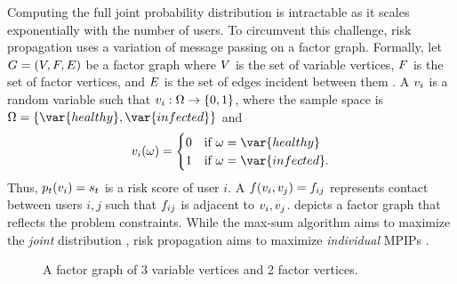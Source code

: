 Computing the full joint probability distribution is intractable as it scales exponentially with the number of users. To circumvent this challenge, risk propagation uses a variation of message passing on a factor graph. Formally, let $G = (V, F, E)$ be a factor graph where $V$ is the set of variable vertices, $F$ is the set of factor vertices, and $E$ is the set of edges incident between them \cite{Kschischang2001}. A  $\vVariable[i]$ is a random variable such that $\vVariable[i]: \eventspace \rightarrow \{0, 1\}$, where the sample space is $\eventspace = \{\var{healthy}, \var{infected}\}$ and
%
\begin{equation*}
    \vVariable[i](\event) =
        \begin{cases}
            0 & \text{if } \event = \var{healthy} \\
            1 & \text{if } \event = \var{infected}.
        \end{cases}
\end{equation*}
%
Thus, $\pr{\vVariable[i]}[\vTime] = \vScore_\vTime$ is a risk score of user $i$. A  $\vFactor(\vVariable[i], \vVariable[j]) = \vFactor[ij]$ represents contact between users $i, j$ such that $\vFactor[ij]$ is adjacent to $\vVariable[i], \vVariable[j]$.  depicts a factor graph that reflects the problem constraints.
While the max-sum algorithm aims to maximize the \emph{joint} distribution \cite[pp. 411--415]{Bishop2006}, risk propagation aims to maximize \emph{individual} MPIPs \cite{Ayday2021}.
%
\begin{figure}[htbp]
    \centering
    \caption[Factor graph]{A factor graph of 3 variable vertices and 2 factor vertices.}
    \label{fig:factor-graph}
\end{figure}
